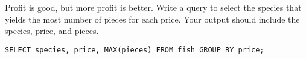 \begin{blocksection}
\question Profit is good, but more profit is better. Write a query to select the species that yields the most number of pieces for each price. Your output should include the species, price, and pieces.


\begin{solution}[0.7in]
\begin{lstlisting}
SELECT species, price, MAX(pieces) FROM fish GROUP BY price;
\end{lstlisting}
\end{solution}
\end{blocksection}

